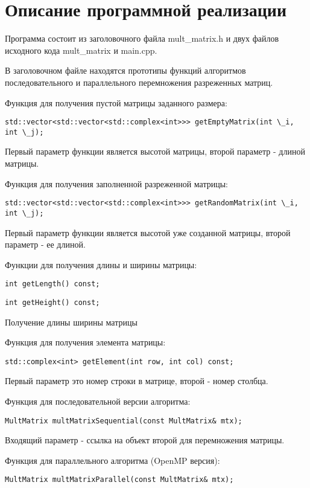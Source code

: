 \documentclass{report}
\begin{document}
\section*{Описание программной реализации}
Программа состоит из заголовочного файла mult\_matrix.h и двух файлов исходного кода mult\_matrix и main.cpp.
\par В заголовочном файле находятся прототипы функций алгоритмов последовательного и параллельного перемножения разреженных матриц.
\par Функция для получения пустой матрицы заданного размера:
\begin{lstlisting}
std::vector<std::vector<std::complex<int>>> getEmptyMatrix(int \_i, int \_j);
\end{lstlisting}
Первый параметр функции является высотой матрицы, второй параметр - длиной матрицы.
\par Функция для получения заполненной разреженной матрицы:
\begin{lstlisting}
std::vector<std::vector<std::complex<int>>> getRandomMatrix(int \_i, int \_j);
\end{lstlisting}
Первый параметр функции является высотой уже созданной матрицы, второй параметр - ее длиной.
\par Функции для получения длины и ширины матрицы:
\begin{lstlisting}
int getLength() const;
\end{lstlisting}
\begin{lstlisting}
int getHeight() const;
\end{lstlisting}
Получение длины ширины матрицы
\par Функция для получения элемента матрицы:
\begin{lstlisting}
std::complex<int> getElement(int row, int col) const;
\end{lstlisting}
Первый параметр это номер строки в матрице, второй - номер столбца.
\par Функция для последовательной версии алгоритма:
\begin{lstlisting}
MultMatrix multMatrixSequential(const MultMatrix& mtx);
\end{lstlisting}
Входящий параметр - ссылка на объект второй для перемножения матрицы.
\par Функция для параллельного алгоритма (OpenMP версия):
\begin{lstlisting}
MultMatrix multMatrixParallel(const MultMatrix& mtx);
\end{lstlisting}
\end{document}
